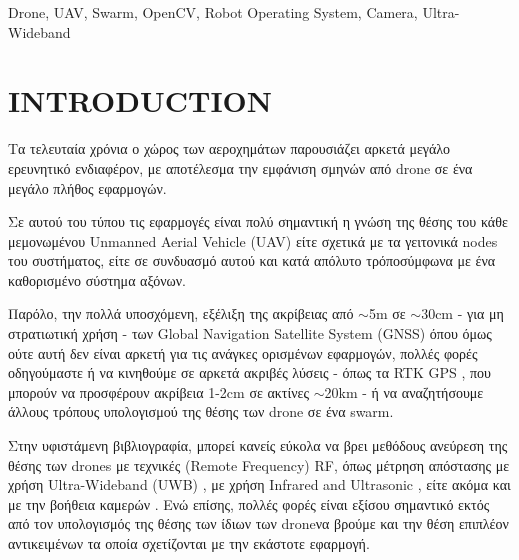 \begin{abstract}
Η συγκεκριμένη διπλωματική ε\-ργα\-σία έχει στόχο την επίτευξη 
υπολογισμού της θέσης - στον τρισδιάστατο χώρο - ενός πρότυπου α\-ντι\-κειμένου, 
από ένα σμήνος drone\udot με όσο δυνατόν χαμηλότερο κόστος υλικού ανά node του 
συστήματος. Ιδανικά θα γίνει προσπάθεια να γίνει multi sensor data fusion 
και να αξιοποιηθούν πληροφορίες τόσο με βάση image-based τεχνικών υπολογισμού, 
όπως επίσης και RF-based.
\end{abstract}
  
\begin{keywords}
Drone, UAV, Swarm, OpenCV, Robot Operating System, Camera, Ultra-Wideband
\end{keywords}

\section{INTRODUCTION}
Τα τελευταία χρόνια ο χώρος των αεροχημάτων παρουσιάζει αρκετά μεγάλο ερευνητικό 
ενδιαφέρον, με αποτέλεσμα την εμφάνιση σμηνών από drone σε ένα μεγάλο
πλήθος εφαρμογών. 

Σε αυτού του τύπου τις εφαρμογές είναι πολύ σημαντική η γνώση της θέσης του κάθε 
μεμονωμένου Unmanned Aerial Vehicle (UAV) είτε σχετικά με τα γειτονικά nodes του 
συστήματος, είτε σε συ\-νδυα\-σμό αυτού και κατά απόλυτο τρόπο\udot σύμφωνα με ένα 
καθορισμένο σύστημα αξόνων.

Παρόλο, την πολλά υποσχόμενη, εξέλιξη της ακρίβειας από $\sim$5m \cite{gps-accuracy}
σε $\sim$30cm \cite{superaccurate-gps} - για μη στρατιωτική χρήση - των 
Global Navigation Satellite System (GNSS)\udot
όπου όμως ούτε αυτή δεν είναι αρκετή για τις ανάγκες ορισμένων εφαρμογών, 
πολλές φορές οδηγούμαστε ή να κινηθούμε σε αρκετά ακριβές 
λύσεις - όπως τα RTK GPS \cite{rtk-gps}, που μπορούν να προσφέρουν ακρίβεια 1-2cm σε 
ακτίνες $\sim$20km - ή να αναζητήσουμε άλλους τρόπους υπολογισμού της θέσης
των drone σε ένα swarm.

Στην υφιστάμενη βιβλιογραφία, μπορεί κανείς εύκολα να βρει μεθόδους ανεύρεση της θέσης  
των drones με τεχνικές (Remote Frequency) RF, όπως μέτρηση απόστασης με 
χρήση Ultra-Wideband (UWB) \cite{ultra-wide-band-localization}, με χρήση Infrared and Ultrasonic \cite{infrared-and-ultrasonic-localization}, 
είτε ακόμα και με την βοήθεια καμερών \cite{camera-localization}. Ενώ επίσης, πολλές φορές είναι
εξίσου σημαντικό εκτός από τον υπολογισμός της θέσης των ίδιων των drone\udot να βρούμε και την
θέση επιπλέον αντικειμένων τα οποία σχετίζονται με την εκάστοτε εφαρμογή.

